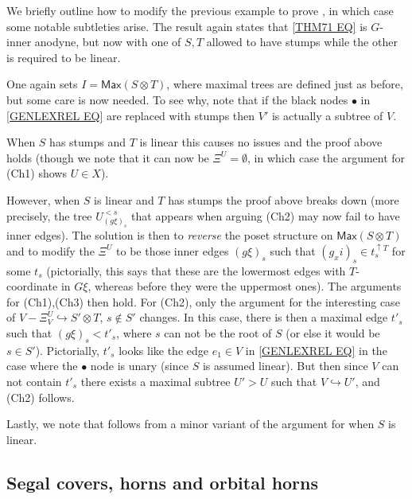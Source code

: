 \documentclass[a4paper,10pt,draft]{article}%
\begin{document}
 
\begin{remark}
We briefly outline how to modify the previous example to prove 
\cite[Thm 7.1(ii)]{Per17}, in which case some notable subtleties arise.
The result again states that \eqref{THM71 EQ} is $G$-inner anodyne, but now with one of $S,T$ allowed to have stumps while the other is required to be linear.

One again sets $I=\mathsf{Max}(S\otimes T)$, where maximal trees are defined just as before, but some care is now needed.
To see why, note that if the black nodes $\bullet$ in \eqref{GENLEXREL EQ} are replaced with stumps then $V'$
is actually a subtree of $V$.

When $S$ has stumps and $T$ is linear this causes no issues and the proof above holds
(though we note that it can now be 
$\Xi^U=\emptyset$, in which case the argument for (Ch1) shows $U\in X$).

However, when $S$ is linear and $T$ has stumps the proof above breaks down (more precisely, the tree $U_{(g\xi)_s}^{<s}$ that appears when arguing (Ch2) may now fail to have inner edges). The solution is then to \textit{reverse} the poset structure on 
$\mathsf{Max}(S\otimes T)$
and to modify the $\Xi^U$ to be those inner edges $(g \xi)_s$ such that
$(g _xi)_s \in t_s^{\uparrow T}$ for some $t_s$
(pictorially, this says that these are the lowermost edges with $T$-coordinate in $G\xi$, whereas before they were the uppermost ones). The arguments for (Ch1),(Ch3) then hold.
For (Ch2), only the argument for the interesting case of
$V- \Xi_V^U \hookrightarrow S' \otimes T$, $s \not \in S'$
changes. In this case, there is then a maximal edge $t'_s$ such that $(g \xi)_s < t'_s$, where $s$ can not be the root of $S$ (or else it would be $s \in S'$). Pictorially, $t'_s$ looks like the edge $e_1 \in V$ in \eqref{GENLEXREL EQ} in the case where the $\bullet$ node is unary (since $S$ is assumed linear). But then since $V$ can not contain $t'_s$ there exists a maximal subtree $U' > U$ such that $V \hookrightarrow U'$,
and (Ch2) follows.

Lastly, we note that \cite[Thm. 7.2]{Per17} follows from a minor variant of the argument for \cite[Thm. 7.1(ii)]{Per17} when $S$ is linear.
\end{remark}




\subsection{Segal covers, horns and orbital horns}
\end{document}
